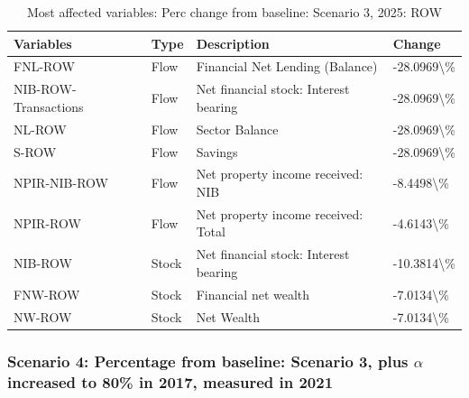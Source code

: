 \documentclass[
]{book}
\begin{document}
\begin{table}

\caption{\label{tab:most-affected-Scenario-3-perc-ROW-2025}Most affected variables: Perc change from baseline: Scenario 3, 2025: ROW}
\centering
\fontsize{10}{12}\selectfont
\begin{tabular}[t]{l|l|l|l}
\hline
Variables & Type & Description & Change\\
\hline
FNL-ROW & Flow & Financial Net Lending (Balance) & -28.0969\textbackslash{}\%\\
\hline
NIB-ROW-Transactions & Flow & Net financial stock: Interest bearing & -28.0969\textbackslash{}\%\\
\hline
NL-ROW & Flow & Sector Balance & -28.0969\textbackslash{}\%\\
\hline
S-ROW & Flow & Savings & -28.0969\textbackslash{}\%\\
\hline
NPIR-NIB-ROW & Flow & Net property income received: NIB & -8.4498\textbackslash{}\%\\
\hline
NPIR-ROW & Flow & Net property income received: Total & -4.6143\textbackslash{}\%\\
\hline
NIB-ROW & Stock & Net financial stock: Interest bearing & -10.3814\textbackslash{}\%\\
\hline
FNW-ROW & Stock & Financial net wealth & -7.0134\textbackslash{}\%\\
\hline
NW-ROW & Stock & Net Wealth & -7.0134\textbackslash{}\%\\
\hline
\end{tabular}
\end{table}

\hypertarget{scenario-4-percentage-from-baseline-scenario-3-plus-alpha-increased-to-80-in-2017-measured-in-2021}{%
\subsubsection{\texorpdfstring{Scenario 4: Percentage from baseline: Scenario 3, plus \(\alpha\) increased to 80\% in 2017, measured in 2021}{Scenario 4: Percentage from baseline: Scenario 3, plus \textbackslash alpha increased to 80\% in 2017, measured in 2021}}\label{scenario-4-percentage-from-baseline-scenario-3-plus-alpha-increased-to-80-in-2017-measured-in-2021}}
\end{document}
